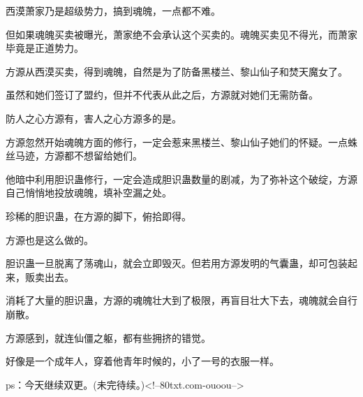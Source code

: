 \begin{this_body}
西漠萧家乃是超级势力，搞到魂魄，一点都不难。

但如果魂魄买卖被曝光，萧家绝不会承认这个买卖的。魂魄买卖见不得光，而萧家毕竟是正道势力。

方源从西漠买卖，得到魂魄，自然是为了防备黑楼兰、黎山仙子和焚天魔女了。

虽然和她们签订了盟约，但并不代表从此之后，方源就对她们无需防备。

防人之心方源有，害人之心方源多的是。

方源忽然开始魂魄方面的修行，一定会惹来黑楼兰、黎山仙子她们的怀疑。一点蛛丝马迹，方源都不想留给她们。

他暗中利用胆识蛊修行，一定会造成胆识蛊数量的剧减，为了弥补这个破绽，方源自己悄悄地投放魂魄，填补空漏之处。

珍稀的胆识蛊，在方源的脚下，俯拾即得。

方源也是这么做的。

胆识蛊一旦脱离了荡魂山，就会立即毁灭。但若用方源发明的气囊蛊，却可包装起来，贩卖出去。

消耗了大量的胆识蛊，方源的魂魄壮大到了极限，再盲目壮大下去，魂魄就会自行崩散。

方源感到，就连仙僵之躯，都有些拥挤的错觉。

好像是一个成年人，穿着他青年时候的，小了一号的衣服一样。

ps：今天继续双更。(未完待续。)<!--80txt.com-ouoou-->

\end{this_body}

